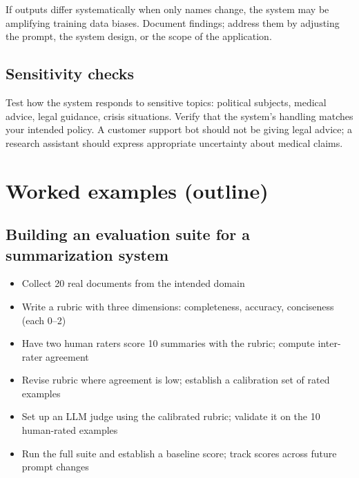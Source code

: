 If outputs differ systematically when only names change, the system may be amplifying training data biases. Document findings; address them by adjusting the prompt, the system design, or the scope of the application.

\subsection{Sensitivity checks}

Test how the system responds to sensitive topics: political subjects, medical advice, legal guidance, crisis situations. Verify that the system's handling matches your intended policy. A customer support bot should not be giving legal advice; a research assistant should express appropriate uncertainty about medical claims.

\section{Worked examples (outline)}

\subsection{Building an evaluation suite for a summarization system}
\begin{itemize}[noitemsep,topsep=0pt]
  \item Collect 20 real documents from the intended domain
  \item Write a rubric with three dimensions: completeness, accuracy, conciseness (each 0--2)
  \item Have two human raters score 10 summaries with the rubric; compute inter-rater agreement
  \item Revise rubric where agreement is low; establish a calibration set of rated examples
  \item Set up an LLM judge using the calibrated rubric; validate it on the 10 human-rated examples
  \item Run the full suite and establish a baseline score; track scores across future prompt changes
\end{itemize}

